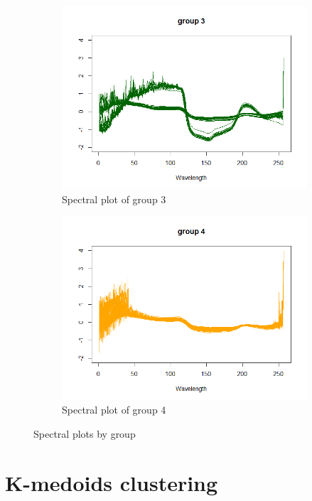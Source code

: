 \documentclass[12pt]{article}
\begin{document}
\begin{figure}[h]
\begin{subfigure}[b]{0.35\linewidth}
    \centering
    \includegraphics[width=\textwidth]{../images/project2/group3_wavelength.png}
 \caption{Spectral plot of group 3}\label{fig:group3_wavelength}
\end{subfigure}%
%
\begin{subfigure}[b]{0.35\linewidth}
    \centering
 \includegraphics[width=\textwidth]{../images/project2/group4_wavelength.png}
 \caption{Spectral plot of group 4}\label{fig:group4_wavelength}
\end{subfigure}%
 \caption{Spectral plots by group}
 \label{spectralByGroup}
\end{figure}


\section{K-medoids clustering}
\end{document}
